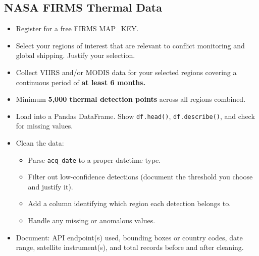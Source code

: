 \documentclass[11pt]{article}
\begin{document}
\subsection{NASA FIRMS Thermal Data}
\begin{itemize}
  \item Register for a free FIRMS MAP\_KEY.
  \item Select your regions of interest that are relevant to conflict monitoring and global shipping. Justify your selection.
  \item Collect VIIRS and/or MODIS data for your selected regions covering a continuous period of \textbf{at least 6 months.}
  \item Minimum \textbf{5,000 thermal detection points} across all regions combined.
  \item Load into a Pandas DataFrame. Show \texttt{df.head()}, \texttt{df.describe()}, and check for missing values.
  \item Clean the data:
  \begin{itemize}
    \item Parse \texttt{acq\_date} to a proper datetime type.
    \item Filter out low-confidence detections (document the threshold you choose and justify it).
    \item Add a column identifying which region each detection belongs to.
    \item Handle any missing or anomalous values.
  \end{itemize}
  \item Document: API endpoint(s) used, bounding boxes or country codes, date range, satellite instrument(s), and total records before and after cleaning.
\end{itemize}
\end{document}
